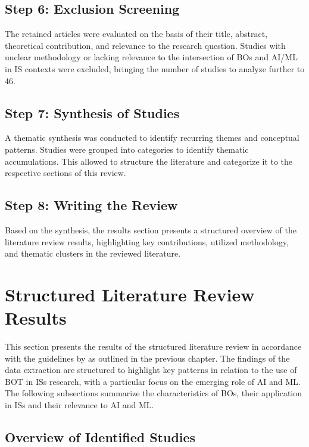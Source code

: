 \documentclass[12pt,oneside]{article}
\begin{document}
\subsection{Step 6: Exclusion Screening}
The retained articles were evaluated on the basis of their title, abstract, theoretical contribution, and relevance to the research question. Studies with unclear methodology or lacking relevance to the intersection of \ac{BO}s and \ac{AI}/\ac{ML} in \ac{IS} contexts were excluded, bringing the number of studies to analyze further to 46. 

\subsection{Step 7: Synthesis of Studies}
A thematic synthesis was conducted to identify recurring themes and conceptual patterns. Studies were grouped into categories to identify thematic accumulations. This allowed to structure the literature and categorize it to the respective sections of this review.

\subsection{Step 8: Writing the Review}
Based on the synthesis, the results section presents a structured overview of the literature review results, highlighting key contributions, utilized methodology, and thematic clusters in the reviewed literature.

\section{Structured Literature Review Results} \label{structured-literature-review-results}

This section presents the results of the structured literature review in accordance with the guidelines by \citet[43-44]{okoli2015guide} as outlined in the previous chapter. The findings of the data extraction are structured to highlight key patterns in relation to the use of \ac{BOT} in \ac{IS}s research, with a particular focus on the emerging role of \ac{AI} and \ac{ML}. The following subsections summarize the characteristics of \ac{BO}s, their application in \ac{IS}s and their relevance to \ac{AI} and \ac{ML}. 

\subsection{Overview of Identified Studies} \label{overview-of-identified-studies}
\end{document}
